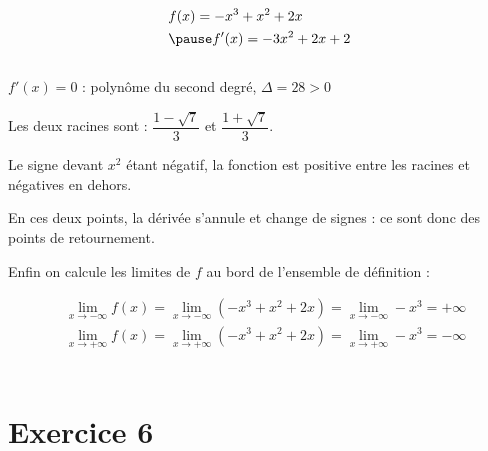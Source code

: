 \documentclass[9pt,handout,professionalfonts,hyperref]{beamer}
\begin{document}
\begin{frame}

\[\begin{aligned}
&f(x)=-x^3+x^2+2x\\
&\pause f'(x)=-3x^2+2x+2
\end{aligned}\]\\

\pause \medskip
$f'(x)=0$ : polynôme du second degré, \pause $\Delta=28>0$ \newline

\pause Les deux racines sont : $\dfrac{1-\sqrt{7}}{3}$ et  $\dfrac{1+\sqrt{7}}{3}$.\newline

\pause Le signe devant $x^2$ étant négatif, \pause la fonction est positive entre les racines et négatives en dehors.\newline

\pause En ces deux points, la dérivée s'annule et change de signes : ce sont donc des points de retournement.\newline

\pause Enfin on calcule les limites de $f$ au bord de l'ensemble de définition :

\[\begin{aligned}
&\lim_{x \to -\infty} f(x)=\lim_{x \to -\infty} (-x^3+x^2+2x) =\lim_{x \to -\infty} -x^3 = +\infty \\
&\lim_{x \to +\infty} f(x)=\lim_{x \to +\infty} (-x^3+x^2+2x) =\lim_{x \to +\infty} -x^3 = -\infty
\end{aligned}\]\\


\end{frame}

\begin{frame}
\begin{adjustbox}{width=\textwidth,center}
\end{adjustbox}


\end{frame}

\section{Exercice 6}
\end{document}
